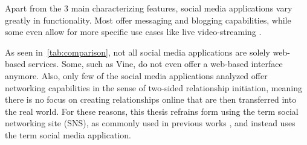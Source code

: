 Apart from the 3 main characterizing features, social media applications vary greatly in functionality.
Most offer messaging and blogging capabilities, while some even allow for more specific use cases like live video-streaming \cite{Ellison2008}.

\begin{table}
    \caption{A comparison of social media applications}
    \label{tab:comparison}
\end{table}

As seen in~\ref{tab:comparison}, not all social media applications are solely web-based services.
Some, such as Vine, do not even offer a web-based interface anymore.
Also, only few of the social media applications analyzed offer networking capabilities in the sense of two-sided relationship initiation,
meaning there is no focus on creating relationships online that are then transferred into the real world.
For these reasons, this thesis refrains form using the term social networking site (SNS), as commonly used in previous works \cite{Ellison2008},
and instead uses the term social media application.
\par

